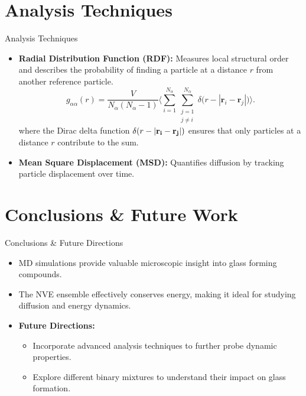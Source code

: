 \documentclass{beamer}
\begin{document}
\section{Analysis Techniques}
\begin{frame}{Analysis Techniques}
  \begin{itemize}
    \item \textbf{Radial Distribution Function (RDF):} Measures local structural order and describes the probability of 
    finding a particle at a distance \(r\) from another reference particle.
      \[
      g_{\alpha\alpha}(r) = \frac{V}{N_\alpha (N_\alpha-1)} \Bigg\langle \sum_{i=1}^{N_\alpha} \sum_{\substack{j=1 \\ j\neq i}}^{N_\alpha} \delta\Big(r-|\mathbf{r}_i-\mathbf{r}_j|\Big) \Bigg\rangle.
      \] 
    where the Dirac delta function \(\delta(r - |\bf{r}_i-\bf{r}_j|)\) ensures that only particles at a distance \(r\) contribute to the sum.
    \item \textbf{Mean Square Displacement (MSD):} Quantifies diffusion by tracking particle displacement over time.
  \end{itemize}
\end{frame}

\section{Conclusions \& Future Work}
\begin{frame}{Conclusions \& Future Directions}
  \begin{itemize}
    \item MD simulations provide valuable microscopic insight into glass forming compounds.
    \item The NVE ensemble effectively conserves energy, making it ideal for studying diffusion and energy dynamics.
    \item \textbf{Future Directions:}
      \begin{itemize}
        \item Incorporate advanced analysis techniques to further probe dynamic properties. 
        \item Explore different binary mixtures to understand their impact on glass formation.
      \end{itemize}
  \end{itemize}
\end{frame}
\end{document}
